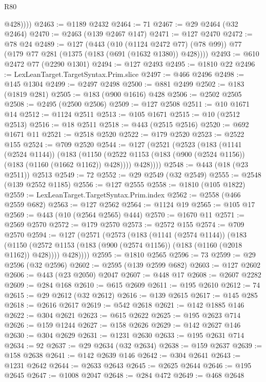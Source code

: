 \begin{lexlean}{R80}
\begin{coremodule}
            @428))))
@2463 := @1189 @2432
@2464 := 71
@2467 := @29 @2464 (@32 @2464)
@2470 := @2463 (@139 @2467 @147)
@2471 := @127 @2470
@2472 := @78 @24
@2489 := @127
    (@443
      (@10 (@1124 @2472 @77) (@78 @99))
      @77
      (@179 @77 @281 (@1375 (@183 (@691 (@1632 @1380)) @428))))
@2493 := @610 @2472 @77 (@2290 @1301)
@2494 := @127 @2493
@2495 := @1810 @22
@2496 := LexLeanTarget.TargetSyntax.Prim.slice
@2497 := @466 @2496
@2498 := @145 @1304
@2499 := @2497 @2498
@2500 := @881 @2499
@2502 := @183 (@1819 @281)
@2505 := @183 (@900 @1616) @428
@2506 := @2502 @2505
@2508 := @2495 (@2500 @2506)
@2509 := @127 @2508
@2511 := @10 @1671 @14
@2512 := @1124 @2511
@2513 := @105 @1671
@2515 := @10 (@2512 @2513)
@2516 := @18 @2511
@2518 := @443 (@2515 @2516)
@2520 := @692 @1671 @11
@2521 := @2518 @2520
@2522 := @179 @2520
@2523 := @2522 @155
@2524 := @709 @2520
@2544 := @127
    (@2521
      (@2523
        (@183
          (@1141 (@2524 @1144))
          (@183
            (@1150 (@2522 @1153 (@183 (@900 (@2524 @1156)) (@183 (@1160 (@1662 @1162)) @428))))
            @428))))
@2548 := @443 (@18 (@23 @2511)) @2513
@2549 := 72
@2552 := @29 @2549 (@32 @2549)
@2555 := @2548 (@139 @2552 @1185)
@2556 := @127 @2555
@2558 := @1810 (@105 @1822)
@2559 := LexLeanTarget.TargetSyntax.Prim.index
@2562 := @2558 (@466 @2559 @682)
@2563 := @127 @2562
@2564 := @1124 @19
@2565 := @105 @17
@2569 := @443 (@10 (@2564 @2565) @444)
@2570 := @1670 @11
@2571 := @2569 @2570
@2572 := @179 @2570
@2573 := @2572 @155
@2574 := @709 @2570
@2594 := @127
    (@2571
      (@2573
        (@183
          (@1141 (@2574 @1144))
          (@183
            (@1150 (@2572 @1153 (@183 (@900 (@2574 @1156)) (@183 (@1160 (@2018 @1162)) @428))))
            @428))))
@2595 := @1810 @2565
@2596 := 73
@2599 := @29 @2596 (@32 @2596)
@2602 := @2595 (@139 @2599 @682)
@2603 := @127 @2602
@2606 := @443 (@23 @2050) @2047
@2607 := @448 @17
@2608 := @2607 @2282
@2609 := @284 @168
@2610 := @615 @2609
@2611 := @195 @2610
@2612 := 74
@2615 := @29 @2612 (@32 @2612)
@2616 := @139 @2615
@2617 := @145 @285
@2618 := @2616 @2617
@2619 := @542 @2618
@2621 := @142 @1885 @146
@2622 := @304 @2621
@2623 := @615 @2622
@2625 := @195 @2623 @714
@2626 := @159 @1244
@2627 := @158 @2626
@2629 := @142 @2627 @146
@2630 := @304 @2629
@2631 := @1231 @2630
@2633 := @195 @2631 @714
@2634 := 92
@2637 := @29 @2634 (@32 @2634)
@2638 := @159 @2637
@2639 := @158 @2638
@2641 := @142 @2639 @146
@2642 := @304 @2641
@2643 := @1231 @2642
@2644 := @2633 @2643
@2645 := @2625 @2644
@2646 := @195 @2645
@2647 := @1008 @2047
@2648 := @284 @472
@2649 := @468 @2648

\end{coremodule}
\end{lexlean}
